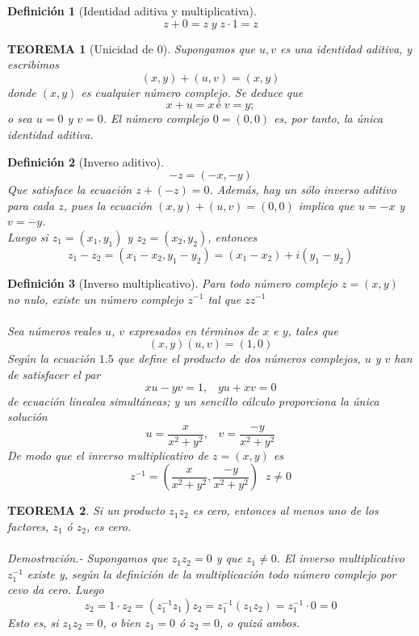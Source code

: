 \documentclass[10pt]{book}
\newtheorem{teo}{\textbf{TEOREMA}}[chapter]%
\newtheorem{def.}{\textbf{Definición}}[chapter]%
\begin{document}
\begin{tcolorbox}[colback = white]
\begin{def.}[Identidad aditiva y multiplicativa]
$$z+0=z \; y \; z\cdot 1 = z$$
\end{def.}
\end{tcolorbox}

\begin{teo}[Unicidad de 0]
Supongamos que $u,v$ es una identidad aditiva, y escribimos $$(x,y)+(u,v) = (x,y)$$ donde $(x,y)$ es cualquier número complejo. Se deduce que $$x+u=x \, é \; v=y;$$ o sea $u=0$ y $v=0$. El número complejo $0=(0,0)$ es, por tanto, la única identidad aditiva. 
\end{teo}

\begin{tcolorbox}[colback = white]
\begin{def.}[Inverso aditivo]
$$-z=(-x,-y)$$ Que satisface la ecuación $z+(-z) =0$. Además, hay un sólo inverso aditivo para cada $z$, pues la ecuación $(x,y)+(u,v)=(0,0)$ implica que $u=-x$ y $v=-y$.\\
Luego si $z_1 = (x_1,y_1)$ y $z_2=(x_2,y_2)$, entonces 
$$z_1 - z_2 = (x_1-x_2,y_1-y_2) = (x_1-x_2)+i(y_1-y_2)$$
\end{def.}
\end{tcolorbox}

\begin{tcolorbox}[colback=white]
    \begin{def.}[Inverso multiplicativo]
	Para todo número complejo $z=(x,y)$ no nulo, existe un número complejo $z^{-1}$ tal que $zz^{-1}$\\\\
	Sea números reales $u$, $v$ expresados en términos de $x$ e $y$, tales que 
	$$(x,y)(u,v)=(1,0)$$
	Según la ecuación $1.5$ que define el producto de dos números complejos, $u$ y $v$ han de satisfacer el par 
	$$xu-yv=1, \;\;\; yu+xv=0$$
	de ecuación linealea simultáneas; y un sencillo cálculo proporciona la única solución 
	$$u=\dfrac{x}{x^2 + y^2},\; \; \; v=\dfrac{-y}{x^2+y^2}$$
	De modo que el inverso multiplicativo de $z=(x,y)$ es 
	$$z^{-1}=\left( \dfrac{x}{x^2+y^2}, \dfrac{-y}{x^2+y^2}  \right)\; \; z\neq 0$$
    \end{def.}
\end{tcolorbox}

\begin{teo}
    Si un producto $z_1 z_2$ es cero, entonces al menos uno de los factores, $z_1$ ó $z_2$, es cero.\\\\
    Demostración.- \; Supongamos que $z_1 z_2 = 0$ y que  $z_1 \neq 0$. El inverso multiplicativo $z_1^{-1}$ existe y, según la definición de la multiplicación todo número complejo por cevo da cero. Luego 
    $$z_2=1\cdot z_2 = (z_1^{-1} z_1)z_2 = z_1^{-1}(z_1 z_2) = z_1^{-1}\cdot 0 = 0 $$
    Esto es, si $z_1 z_2 = 0$, o bien $z_1=0$ ó $z_2=0$, o quizá ambos.\\\\
\end{teo}
\end{document}
